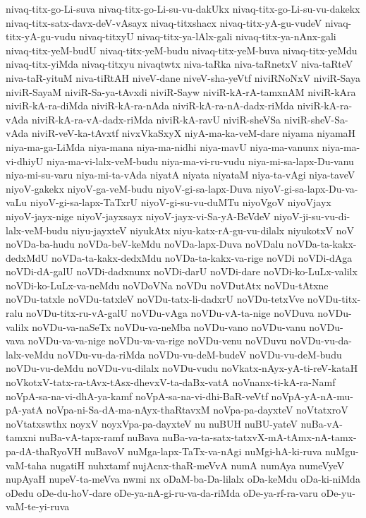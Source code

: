 {nivaq-titx-go-Li-suva
nivaq-titx-go-Li-su-vu-dakUkx
nivaq-titx-go-Li-su-vu-dakekx
nivaq-titx-satx-davx-deV-vAsayx
nivaq-titxshacx
nivaq-titx-yA-gu-vudeV
nivaq-titx-yA-gu-vudu
nivaq-titxyU
nivaq-titx-ya-lAlx-gali
nivaq-titx-ya-nAnx-gali
nivaq-titx-yeM-budU
nivaq-titx-yeM-budu
nivaq-titx-yeM-buva
nivaq-titx-yeMdu
nivaq-titx-yiMda
nivaq-titxyu
nivaqtwtx
niva-taRka
niva-taRnetxV
niva-taRteV
niva-taR-yituM
niva-tiRtAH
niveV-dane
niveV-sha-yeVtf
niviRNoNxV
niviR-Saya
niviR-SayaM
niviR-Sa-ya-tAvxdi
niviR-Sayw
niviR-kA-rA-tamxnAM
niviR-kAra
niviR-kA-ra-diMda
niviR-kA-ra-nAda
niviR-kA-ra-nA-dadx-riMda
niviR-kA-ra-vAda
niviR-kA-ra-vA-dadx-riMda
niviR-kA-ravU
niviR-sheVSa
niviR-sheV-Sa-vAda
niviR-veV-ka-tAvxtf
nivxVkaSxyX
niyA-ma-ka-veM-dare
niyama
niyamaH
niya-ma-ga-LiMda
niya-mana
niya-ma-nidhi
niya-mavU
niya-ma-vanunx
niya-ma-vi-dhiyU
niya-ma-vi-lalx-veM-budu
niya-ma-vi-ru-vudu
niya-mi-sa-lapx-Du-vanu
niya-mi-su-varu
niya-mi-ta-vAda
niyatA
niyata
niyataM
niya-ta-vAgi
niya-taveV
niyoV-gakekx
niyoV-ga-veM-budu
niyoV-gi-sa-lapx-Duva
niyoV-gi-sa-lapx-Du-va-vaLu
niyoV-gi-sa-lapx-TaTxrU
niyoV-gi-su-vu-duMTu
niyoVgoV
niyoVjayx
niyoV-jayx-nige
niyoV-jayxsayx
niyoV-jayx-vi-Sa-yA-BeVdeV
niyoV-ji-su-vu-di-lalx-veM-budu
niyu-jayxteV
niyukAtx
niyu-katx-rA-gu-vu-dilalx
niyukotxV
noV
noVDa-ba-hudu
noVDa-beV-keMdu
noVDa-lapx-Duva
noVDalu
noVDa-ta-kakx-dedxMdU
noVDa-ta-kakx-dedxMdu
noVDa-ta-kakx-va-rige
noVDi
noVDi-dAga
noVDi-dA-galU
noVDi-dadxnunx
noVDi-darU
noVDi-dare
noVDi-ko-LuLx-valilx
noVDi-ko-LuLx-va-neMdu
noVDoVNa
noVDu
noVDutAtx
noVDu-tAtxne
noVDu-tatxle
noVDu-tatxleV
noVDu-tatx-li-dadxrU
noVDu-tetxVve
noVDu-titx-ralu
noVDu-titx-ru-vA-galU
noVDu-vAga
noVDu-vA-ta-nige
noVDuva
noVDu-valilx
noVDu-va-naSeTx
noVDu-va-neMba
noVDu-vano
noVDu-vanu
noVDu-vava
noVDu-va-va-nige
noVDu-va-va-rige
noVDu-venu
noVDuvu
noVDu-vu-da-lalx-veMdu
noVDu-vu-da-riMda
noVDu-vu-deM-budeV
noVDu-vu-deM-budu
noVDu-vu-deMdu
noVDu-vu-dilalx
noVDu-vudu
noVkatx-nAyx-yA-ti-reV-kataH
noVkotxV-tatx-ra-tAvx-tAsx-dhevxV-ta-daBx-vatA
noVnanx-ti-kA-ra-Namf
noVpA-sa-na-vi-dhA-ya-kamf
noVpA-sa-na-vi-dhi-BaR-veVtf
noVpA-yA-nA-mu-pA-yatA
noVpa-ni-Sa-dA-ma-nAyx-thaRtavxM
noVpa-pa-dayxteV
noVtatxroV
noVtatxswthx
noyxV
noyxVpa-pa-dayxteV
nu
nuBUH
nuBU-yateV
nuBa-vA-tamxni
nuBa-vA-tapx-ramf
nuBava
nuBa-va-ta-satx-tatxvX-mA-tAmx-nA-tamx-pa-dA-thaRyoVH
nuBavoV
nuMga-lapx-TaTx-va-nAgi
nuMgi-hA-ki-ruva
nuMgu-vaM-taha
nugatiH
nuhxtamf
nujAcnx-thaR-meVvA
numA
numAya
numeVyeV
nupAyaH
nupeV-ta-meVva
nwmi
nx
oDaM-ba-Da-lilalx
oDa-keMdu
oDa-ki-niMda
oDedu
oDe-du-hoV-dare
oDe-ya-nA-gi-ru-va-da-riMda
oDe-ya-rf-ra-varu
oDe-yu-vaM-te-yi-ruva
}
